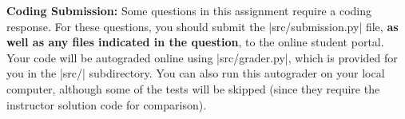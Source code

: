 {\bf Coding Submission:}
Some questions in this assignment require a coding response.  For these questions, you should submit the |src/submission.py| file, \textbf{as well as any files indicated in the question}, to the online student portal.  Your code will be
autograded online using |src/grader.py|, which is provided for you in the |src/|
subdirectory. You can also run this autograder on your local computer, although some of the tests will be skipped (since they
require the instructor solution code for comparison).